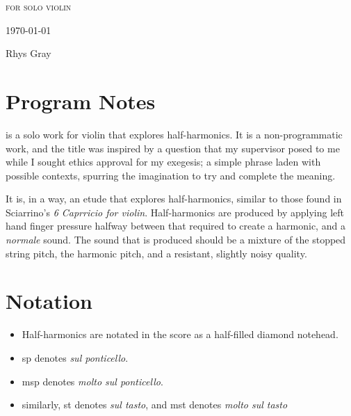 

\invisiblechapter{\violinPiece}

\vspace{3.8cm}

\begin{center}

\textsc{for solo violin}

\vspace{2.8cm}

\HRule{0.5pt}

\LARGE \textbf{\uppercase{\violinPiece}}

\HRule{2pt}

\vspace{1.8cm}

\normalsize \today

\vspace{3.8cm}

Rhys Gray

\end{center}
\newpage
\section*{Program Notes}
\violinPiece is a solo work for violin that explores half-harmonics.
It is a non-programmatic work, and the title was inspired by a question that my supervisor posed to me while I sought ethics approval for my exegesis; a simple phrase laden with possible contexts, spurring the imagination to try and complete the meaning.

It is, in a way, an etude that explores half-harmonics, similar to those found in Sciarrino's \emph{6 Caprricio for violin}. 
Half-harmonics are produced by applying left hand finger pressure halfway between that required to create a harmonic, and a \emph{normale} sound. 
The sound that is produced should be a mixture of the stopped string pitch, the harmonic pitch, and a resistant, slightly noisy quality.

\section*{Notation}
\begin{itemize}

    \item Half-harmonics are notated in the score as a half-filled diamond notehead.
    \item sp denotes \emph{sul ponticello}.
    \item msp denotes \emph{molto sul ponticello}.
    \item similarly, st denotes \emph{sul tasto}, and mst denotes \emph{molto sul tasto}
\end{itemize}

\newpage

% 

